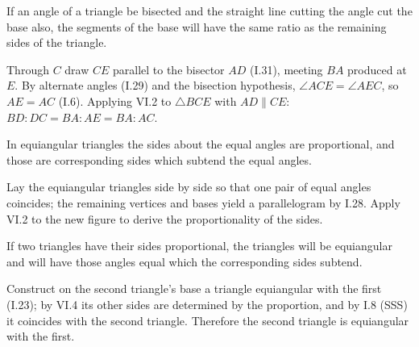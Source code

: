 \begin{claim}
\label{prop:VI.3}
If an angle of a triangle be bisected and the straight line cutting
the angle cut the base also, the segments of the base will have the
same ratio as the remaining sides of the triangle.
\end{claim}
\begin{evidence}[Proof of VI.3]
\label{ev:VI.3}
Through $C$ draw $CE$ parallel to the bisector $AD$ (I.31), meeting
$BA$ produced at $E$.  By alternate angles (I.29) and the bisection
hypothesis, $\angle ACE = \angle AEC$, so $AE = AC$ (I.6).  Applying
VI.2 to $\triangle BCE$ with $AD \parallel CE$: $BD : DC = BA : AE =
BA : AC$.
\end{evidence}

\begin{claim}
\label{prop:VI.4}
In equiangular triangles the sides about the equal angles are
proportional, and those are corresponding sides which subtend the
equal angles.
\end{claim}
\begin{evidence}[Proof of VI.4]
\label{ev:VI.4}
Lay the equiangular triangles side by side so that one pair of equal
angles coincides; the remaining vertices and bases yield a
parallelogram by I.28.  Apply VI.2 to the new figure to derive the
proportionality of the sides.
\end{evidence}

\begin{claim}
\label{prop:VI.5}
If two triangles have their sides proportional, the triangles will be
equiangular and will have those angles equal which the corresponding
sides subtend.
\end{claim}
\begin{evidence}[Proof of VI.5]
\label{ev:VI.5}
Construct on the second triangle's base a triangle equiangular with
the first (I.23); by VI.4 its other sides are determined by the
proportion, and by I.8 (SSS) it coincides with the second triangle.
Therefore the second triangle is equiangular with the first.
\end{evidence}

